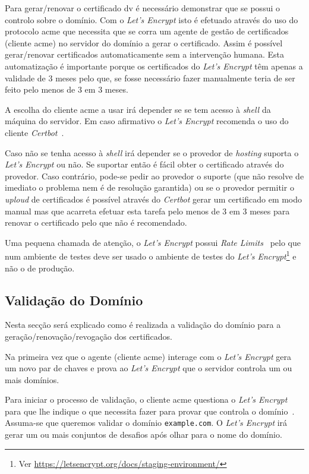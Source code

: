 Para gerar/renovar o certificado \acrshort{dv} é necessário demonstrar que se possui o controlo sobre o domínio. Com o \textit{Let's Encrypt} isto é efetuado através do uso do protocolo \acrfull{acme} que necessita que se corra um agente de gestão de certificados (cliente \acrshort{acme}) no servidor do domínio a gerar o certificado. Assim é possível gerar/renovar certificados automaticamente sem a intervenção humana. Esta automatização é importante porque os certificados do \textit{Let's Encrypt} têm apenas a validade de 3 meses pelo que, se fosse necessário fazer manualmente teria de ser feito pelo menos de 3 em 3 meses.

A escolha do cliente \acrshort{acme} a usar irá depender se se tem acesso à \textit{shell} da máquina do servidor. Em caso afirmativo o \textit{Let's Encrypt} recomenda o uso do cliente \textit{Certbot}~\cite{letEnc}.

Caso não se tenha acesso à \textit{shell} irá depender se o provedor de \textit{hosting} suporta o \textit{Let's Encrypt} ou não. Se suportar então é fácil obter o certificado através do provedor. Caso contrário, pode-se pedir ao provedor o suporte (que não resolve de imediato o problema nem é de resolução garantida) ou se o provedor permitir o \textit{uploud} de certificados é possível através do \textit{Certbot} gerar um certificado em modo manual mas que acarreta efetuar esta tarefa pelo menos de 3 em 3 meses para renovar o certificado pelo que não é recomendado.

Uma pequena chamada de atenção, o \textit{Let's Encrypt} possui \textit{Rate Limits}~\cite{LErateLimits} pelo que num ambiente de testes deve ser usado o ambiente de testes do \textit{Let's Encrypt}\footnote{Ver \url{https://letsencrypt.org/docs/staging-environment/}} e não o de produção.

\subsection{Validação do Domínio}\label{sec:valDom}

Nesta secção será explicado como é realizada a validação do domínio para a geração/renovação/revogação dos certificados.

Na primeira vez que o agente (cliente \acrshort{acme}) interage com o \textit{Let's Encrypt} gera um novo par de chaves e prova ao \textit{Let's Encrypt} que o servidor controla um ou mais domínios.~\cite{domainValidation}

Para iniciar o processo de validação, o cliente \acrshort{acme} questiona o \textit{Let's Encrypt} para que lhe indique o que necessita fazer para provar que controla o domínio~\cite{domainValidation}. Assuma-se que queremos validar o domínio \texttt{example.com}.
O \textit{Let's Encrypt} irá gerar um ou mais conjuntos de desafios após olhar para o nome do domínio.

